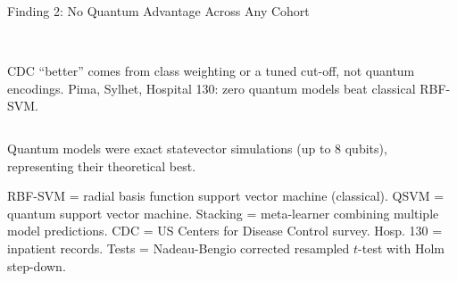 \documentclass[aspectratio=169,10pt,t,xcolor={table,dvipsnames}]{beamer}
\newcommand{\pfoot}[1]{\vfill{\raggedright\tiny\color{qslate}#1\par}}
\begin{document}
\begin{frame}{Finding 2: No Quantum Advantage Across Any Cohort}
\begin{columns}[T]
\\[2pt]
      {\tiny CDC ``better'' comes from class weighting or a tuned cut-off, not quantum encodings. Pima, Sylhet, Hospital 130: zero quantum models beat classical RBF-SVM.}
  \end{columns}
  \vspace{2pt}
  {\scriptsize Quantum models were exact statevector simulations (up to 8 qubits), representing their theoretical best.\par}
  \pfoot{RBF-SVM = radial basis function support vector machine (classical). QSVM = quantum support vector machine. Stacking = meta-learner combining multiple model predictions. CDC = US Centers for Disease Control survey. Hosp. 130 = inpatient records. Tests = Nadeau-Bengio corrected resampled $t$-test with Holm step-down.}
\end{frame}
\end{document}
